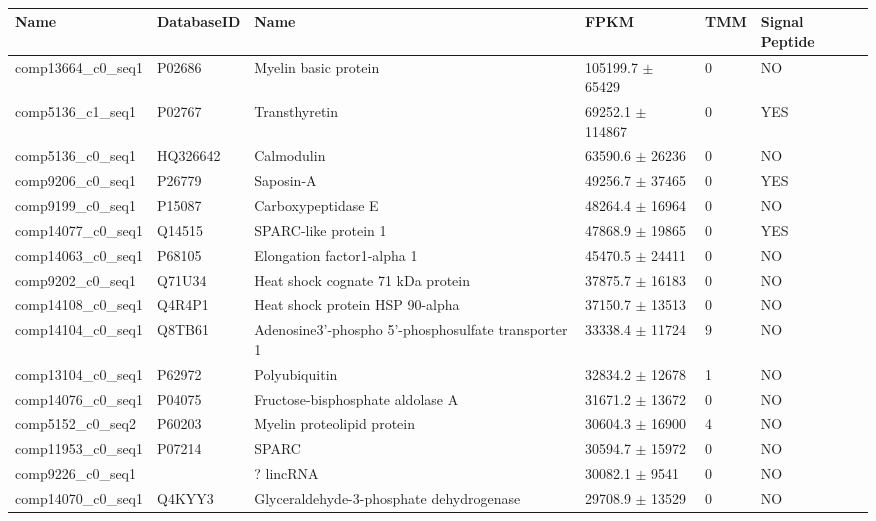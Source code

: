 \documentclass[10.5pt]{article}
\begin{document}
\textbf{\hypertarget{Table 2}{}} \\
\begin{center}
    \begin{tabular}{ | p{3.4cm} | p{2.1cm} | p{4cm}  | p{2cm} | p{1.3cm} | p{1.8cm} |}
    \hline
\textbf{Name} 	&	 \textbf{DatabaseID} 	&	 \textbf{Name} 	&	 \textbf{FPKM}  	&	 \textbf{TMM} 	&	\textbf{Signal Peptide}	\\ \hline
comp13664\_c0\_seq1 	&	 P02686 	&	 Myelin basic protein 	&	105199.7	$\pm$	65429	&	0	&	NO	\\ \hline
comp5136\_c1\_seq1 	&	 P02767 	&	 Transthyretin 	&	69252.1	$\pm$	114867	&	0	&	 YES 	\\ \hline
comp5136\_c0\_seq1 	&	 HQ326642 	&	 Calmodulin	&	63590.6	$\pm$	26236	&	0	&	NO	\\ \hline
comp9206\_c0\_seq1 	&	 P26779 	&	 Saposin-A  	&	49256.7	$\pm$	37465	&	0	&	 YES	\\ \hline
comp9199\_c0\_seq1 	&	 P15087 	&	 Carboxypeptidase E	&	48264.4	$\pm$	16964	&	0	&	NO	\\ \hline
comp14077\_c0\_seq1 	&	 Q14515 	&	 SPARC-like protein 1 	&	47868.9	$\pm$	19865	&	0	&	 YES	\\ \hline
comp14063\_c0\_seq1 	&	 P68105 	&	 Elongation factor1-alpha 1	&	45470.5	$\pm$	24411	&	0	&	NO	\\ \hline
comp9202\_c0\_seq1 	&	 Q71U34 	&	 Heat shock cognate 71 kDa protein	&	37875.7	$\pm$	16183	&	0	&	NO	\\ \hline
comp14108\_c0\_seq1 	&	 Q4R4P1 	&	 Heat shock protein HSP 90-alpha	&	37150.7	$\pm$	13513	&	0	&	NO	\\ \hline
comp14104\_c0\_seq1 	&	 Q8TB61 	&	 Adenosine3'-phospho 5'-phosphosulfate transporter 1 	&	33338.4	$\pm$	11724	&	9	&	NO	\\ \hline
comp13104\_c0\_seq1 	&	 P62972 	&	 Polyubiquitin 	&	32834.2	$\pm$	12678	&	1	&	NO	\\ \hline
comp14076\_c0\_seq1 	&	 P04075 	&	 Fructose-bisphosphate aldolase A	&	31671.2	$\pm$	13672	&	0	&	NO	\\ \hline
comp5152\_c0\_seq2 	&	 P60203 	&	 Myelin proteolipid protein 	&	30604.3	$\pm$	16900	&	4	&	NO	\\ \hline
comp11953\_c0\_seq1 	&	 P07214 	&	 SPARC	&	30594.7	$\pm$	15972	&	0	&	NO	\\ \hline
comp9226\_c0\_seq1 	&		&	 ? lincRNA	&	30082.1	$\pm$	9541	&	0	&	NO	\\ \hline
comp14070\_c0\_seq1 	&	 Q4KYY3 	&	 Glyceraldehyde-3-phosphate dehydrogenase	&	29708.9	$\pm$	13529	&	0	&	NO	\\ \hline

\end{tabular}
\end{center}
\end{document}
